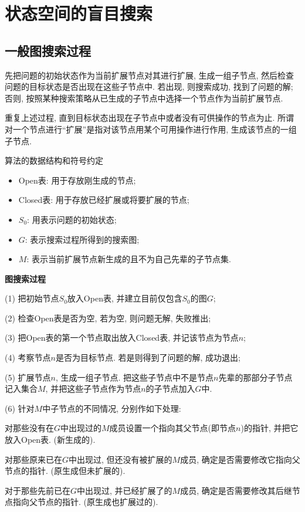 \section{状态空间的盲目搜索}
\subsection{一般图搜索过程}
先把问题的初始状态作为当前扩展节点对其进行扩展, 生成一组子节点, 然后检查问题的目标状态是否出现在这些子节点中. 若出现, 则搜索成功, 找到了问题的解; 否则, 按照某种搜索策略从已生成的子节点中选择一个节点作为当前扩展节点.

重复上述过程, 直到目标状态出现在子节点中或者没有可供操作的节点为止. 所谓对一个节点进行“扩展”是指对该节点用某个可用操作进行作用, 生成该节点的一组子节点.

算法的数据结构和符号约定
\begin{itemize}
\item Open表: 用于存放刚生成的节点;
\item Closed表: 用于存放已经扩展或将要扩展的节点;
\item $S_0$: 用表示问题的初始状态;
\item $G$: 表示搜索过程所得到的搜索图;
\item $M$: 表示当前扩展节点新生成的且不为自己先辈的子节点集.
\end{itemize}

\textbf{图搜索过程}

(1) 把初始节点$S_0$放入Open表, 并建立目前仅包含$S_0$的图$G$;

(2) 检查Open表是否为空, 若为空, 则问题无解, 失败推出;

(3) 把Open表的第一个节点取出放入Closed表, 并记该节点为节点$n$;

(4) 考察节点$n$是否为目标节点. 若是则得到了问题的解, 成功退出;

(5) 扩展节点$n$, 生成一组子节点. 把这些子节点中不是节点$n$先辈的那部分子节点记入集合$M$, 并把这些子节点作为节点$n$的子节点加入$G$中.

(6) 针对$M$中子节点的不同情况, 分别作如下处理:

    \quad {} 对那些没有在$G$中出现过的$M$成员设置一个指向其父节点(即节点$n$)的指针, 并把它放入Open表. (新生成的).

    \quad {} 对那些原来已在$G$中出现过, 但还没有被扩展的$M$成员, 确定是否需要修改它指向父节点的指针. (原生成但未扩展的).

    \quad {} 对于那些先前已在$G$中出现过, 并已经扩展了的$M$成员, 确定是否需要修改其后继节点指向父节点的指针. (原生成也扩展过的).

